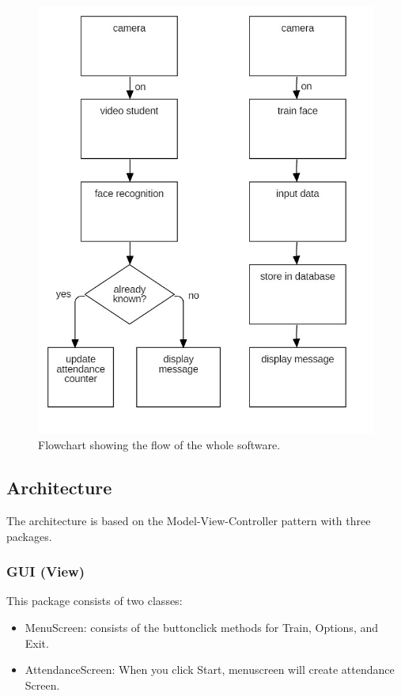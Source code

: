 \documentclass[12pt, a4paper]{article}
\begin{document}
\begin{figure}[h!]
\begin{center}
	\centering
		\includegraphics[width=1.0\columnwidth]{images/flowchart_diagram_whole_software}
	\caption{Flowchart showing the flow of the whole software.}
	\label{fig:folder}
\end{center}
\end{figure}

\subsection{Architecture}
The architecture is based on the Model-View-Controller pattern with three packages.
\subsubsection{GUI (View)}
This package consists of two classes: 
\begin{itemize}
\item MenuScreen: consists of the buttonclick methods for  Train, Options, and Exit. 
\item AttendanceScreen: When you click Start, menuscreen will create attendance Screen.
\end{itemize}
\end{document}

